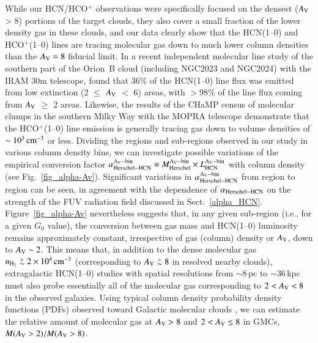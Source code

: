 \documentclass{aa}
\def\gtsima{$\; \buildrel > \over \sim \;$}
\def\simgt{\lower.5ex\hbox{\gtsima}}
\begin{document}
{While our HCN/HCO$^+$ observations were specifically focused on the densest ($A_{\rm V}$ > 8) portions of the target clouds, 
they also cover a small fraction of the lower density gas in these clouds, and our data clearly show that the HCN(1--0) 
and HCO$^{+}$(1--0) lines are tracing molecular gas down to much lower column densities than the $A_{\rm V} = 8$ fiducial limit. 
In a recent  independent molecular line study of the southern part of the Orion~B cloud (including NGC2023 and NGC2024) with the IRAM 30m telescope, 
\citet{Pety16} found that 36\% of the HCN(1--0) line flux was emitted from low extinction (2 $\le$ $A_{\rm V}$ $<$ 6) areas,  
with $> 98\% $ of the line flux coming from $A_{\rm V}$ $\ge$ 2 areas. {Likewise, the results of the CHaMP census of molecular clumps in the southern Milky Way with the MOPRA telescope \citep[e.g.][]{Barnes2016} demonstrate that the HCO$^{+}$(1--0) line emission is generally tracing gas down to volume densities of $\sim 10^3\, {\rm cm}^{-3}$ or less.}
Dividing the regions and sub-regions observed in our study in various column density bins, we can investigate possible variations 
of the empirical conversion factor $\alpha_{\rm Herschel-HCN}^{\rm A_V-bin} \equiv M_{\rm Herschel}^{\rm A_V-bin} \times L_{\rm HCN}^{\rm A_V-bin}$ 
with column density (see Fig.~\ref{fig_alpha-Av}). 
Significant variations in $\alpha_{\rm Herschel-HCN}^{\rm A_V-bin}$ from region to region can be seen,  
in agreement with the dependence of $\alpha_{\rm Herschel-HCN}$ on the strength of the FUV radiation field discussed in Sect.~\ref{alpha_HCN}. 
Figure~\ref{fig_alpha-Av} nevertheless suggests that, in any given sub-region (i.e., for a given $G_0$ value), the conversion between gas mass 
and HCN(1--0) luminosity remains approximately constant, irrespective of gas (column) density or $A_{\rm V}$, down to $A_{\rm V} \sim 2$. 
This means that, in addition to the dense molecular gas $n_{\rm H_2} \simgt  2 \times10^4\, \rm{cm}^{-3}$ (corresponding to $A_{\rm V} \simgt 8$ in resolved nearby clouds),  
extragalactic HCN(1--0) studies with spatial resolutions from $\sim 8\,$pc to $\sim 36\,$kpc  \citep{Chin97, Chin98,Gao04a,Brouillet05, Buchbender13,Chen15, Chen16} 
must also probe essentially all of the molecular gas corresponding to $2 <  A_{\rm V} < 8$ in the observed galaxies. 
Using typical column density probability density functions (PDFs) observed toward Galactic molecular clouds \citep[e.g.][]{Schneider13}, 
we can estimate the relative amount of molecular gas at $A_{\rm V} > 8$ and $2 <  A_{\rm V} \le 8$ in GMCs, $M(A_{\rm V} >2)/M(A_{\rm V} >8)$.
}
\end{document}
